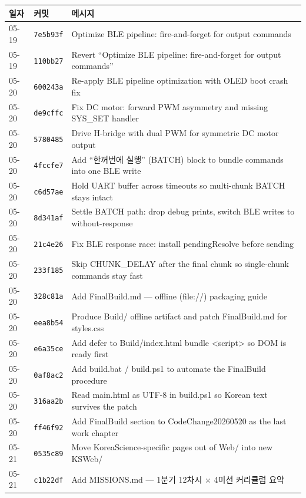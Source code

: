 \documentclass[11pt, oneside]{article}
\begin{document}
\begin{table}[h]
\centering
\small
\begin{tabularx}{\linewidth}{@{}llX@{}}
\toprule
일자 & 커밋 & 메시지 \\
\midrule
05-19 & \texttt{7e5b93f} & Optimize BLE pipeline: fire-and-forget for output commands \\
05-19 & \texttt{110bb27} & Revert ``Optimize BLE pipeline: fire-and-forget for output commands'' \\
05-20 & \texttt{600243a} & Re-apply BLE pipeline optimization with OLED boot crash fix \\
05-20 & \texttt{de9cffc} & Fix DC motor: forward PWM asymmetry and missing SYS\_SET handler \\
05-20 & \texttt{5780485} & Drive H-bridge with dual PWM for symmetric DC motor output \\
05-20 & \texttt{4fccfe7} & Add ``한꺼번에 실행'' (BATCH) block to bundle commands into one BLE write \\
05-20 & \texttt{c6d57ae} & Hold UART buffer across timeouts so multi-chunk BATCH stays intact \\
05-20 & \texttt{8d341af} & Settle BATCH path: drop debug prints, switch BLE writes to without-response \\
05-20 & \texttt{21c4e26} & Fix BLE response race: install pendingResolve before sending \\
05-20 & \texttt{233f185} & Skip CHUNK\_DELAY after the final chunk so single-chunk commands stay fast \\
05-20 & \texttt{328c81a} & Add FinalBuild.md --- offline (file://) packaging guide \\
05-20 & \texttt{eea8b54} & Produce Build/ offline artifact and patch FinalBuild.md for styles.css \\
05-20 & \texttt{e6a35ce} & Add defer to Build/index.html bundle <script> so DOM is ready first \\
05-20 & \texttt{0af8ac2} & Add build.bat / build.ps1 to automate the FinalBuild procedure \\
05-20 & \texttt{316aa2b} & Read main.html as UTF-8 in build.ps1 so Korean text survives the patch \\
05-20 & \texttt{ff46f92} & Add FinalBuild section to CodeChange20260520 as the last work chapter \\
\midrule
05-21 & \texttt{0535c89} & Move KoreaScience-specific pages out of Web/ into new KSWeb/ \\
05-21 & \texttt{c1b22df} & Add MISSIONS.md --- 1분기 12차시 × 4미션 커리큘럼 요약 \\

\end{tabularx}
\end{table}
\end{document}
